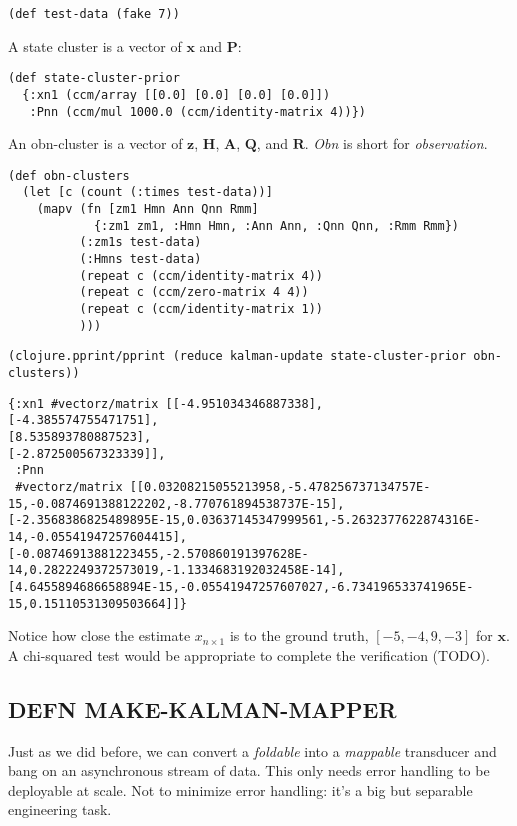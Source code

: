 \documentclass[10pt,oneside,x11names]{article}
\begin{document}
\begin{verbatim}
(def test-data (fake 7))
\end{verbatim}

A state cluster is a vector of \(\boldsymbol{x}\) and \(\boldsymbol{P}\):

\begin{verbatim}
(def state-cluster-prior
  {:xn1 (ccm/array [[0.0] [0.0] [0.0] [0.0]])
   :Pnn (ccm/mul 1000.0 (ccm/identity-matrix 4))})
\end{verbatim}

An obn-cluster is a vector of \(\boldsymbol{z}\), \(\boldsymbol{H}\),
\(\boldsymbol{A}\), \(\boldsymbol{Q}\), and \(\boldsymbol{R}\). \emph{Obn} is short
for \emph{observation}.

\begin{verbatim}
(def obn-clusters
  (let [c (count (:times test-data))]
    (mapv (fn [zm1 Hmn Ann Qnn Rmm]
            {:zm1 zm1, :Hmn Hmn, :Ann Ann, :Qnn Qnn, :Rmm Rmm})
          (:zm1s test-data)
          (:Hmns test-data)
          (repeat c (ccm/identity-matrix 4))
          (repeat c (ccm/zero-matrix 4 4))
          (repeat c (ccm/identity-matrix 1))
          )))
\end{verbatim}

\begin{verbatim}
(clojure.pprint/pprint (reduce kalman-update state-cluster-prior obn-clusters))
\end{verbatim}

\begin{verbatim}
{:xn1 #vectorz/matrix [[-4.951034346887338],
[-4.385574755471751],
[8.535893780887523],
[-2.872500567323339]],
 :Pnn
 #vectorz/matrix [[0.03208215055213958,-5.478256737134757E-15,-0.0874691388122202,-8.770761894538737E-15],
[-2.3568386825489895E-15,0.03637145347999561,-5.2632377622874316E-14,-0.05541947257604415],
[-0.08746913881223455,-2.570860191397628E-14,0.2822249372573019,-1.1334683192032458E-14],
[4.6455894686658894E-15,-0.05541947257607027,-6.734196533741965E-15,0.15110531309503664]]}
\end{verbatim}


Notice how close the estimate \(x_{n\times{1}}\) is to the ground truth, \([-5, -4,
9, -3]\) for \(\boldsymbol{x}\). A chi-squared test would be appropriate to
complete the verification (TODO).

\subsection{DEFN MAKE-KALMAN-MAPPER}
\label{make-kalman-mapper}
Just as we did before, we can convert a \emph{foldable} into a \emph{mappable}
transducer and bang on an asynchronous stream of data. This only needs
error handling to be deployable at scale. Not to minimize error
handling: it's a big but separable engineering task.
\end{document}
